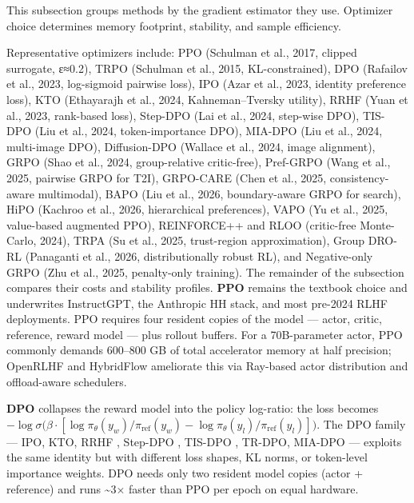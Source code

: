 \documentclass{article}
\begin{document}
This subsection groups methods by the gradient estimator they use. Optimizer choice determines memory footprint, stability, and sample efficiency.

Representative optimizers include: PPO (Schulman et al., 2017, clipped surrogate, ε≈0.2), TRPO (Schulman et al., 2015, KL-constrained), DPO (Rafailov et al., 2023, log-sigmoid pairwise loss), IPO (Azar et al., 2023, identity preference loss), KTO (Ethayarajh et al., 2024, Kahneman--Tversky utility), RRHF (Yuan et al., 2023, rank-based loss), Step-DPO (Lai et al., 2024, step-wise DPO), TIS-DPO (Liu et al., 2024, token-importance DPO), MIA-DPO (Liu et al., 2024, multi-image DPO), Diffusion-DPO (Wallace et al., 2024, image alignment), GRPO (Shao et al., 2024, group-relative critic-free), Pref-GRPO (Wang et al., 2025, pairwise GRPO for T2I), GRPO-CARE (Chen et al., 2025, consistency-aware multimodal), BAPO (Liu et al., 2026, boundary-aware GRPO for search), HiPO (Kachroo et al., 2026, hierarchical preferences), VAPO (Yu et al., 2025, value-based augmented PPO), REINFORCE++ and RLOO (critic-free Monte-Carlo, 2024), TRPA (Su et al., 2025, trust-region approximation), Group DRO-RL (Panaganti et al., 2026, distributionally robust RL), and Negative-only GRPO (Zhu et al., 2025, penalty-only training). The remainder of the subsection compares their costs and stability profiles. \textbf{PPO} \citep{schulman2017proximalpolicyopti} remains the textbook choice and underwrites InstructGPT, the Anthropic HH stack, and most pre-2024 RLHF deployments. PPO requires four resident copies of the model --- actor, critic, reference, reward model --- plus rollout buffers. For a 70B-parameter actor, PPO commonly demands 600--800 GB of total accelerator memory at half precision; OpenRLHF \citep{hu20252025} and HybridFlow \citep{sheng20242024} ameliorate this via Ray-based actor distribution and offload-aware schedulers.

\textbf{DPO} \citep{rafailov20232023} collapses the reward model into the policy log-ratio: the loss becomes \(-\log \sigma\bigl(\beta \cdot [\log \pi_\theta(y_w)/\pi_{\mathrm{ref}}(y_w) - \log \pi_\theta(y_l)/\pi_{\mathrm{ref}}(y_l)]\bigr)\). The DPO family --- IPO, KTO, RRHF \citep{yuan20232023}, Step-DPO \citep{lai20242024}, TIS-DPO \citep{liu20242024}, TR-DPO, MIA-DPO --- exploits the same identity but with different loss shapes, KL norms, or token-level importance weights. DPO needs only two resident model copies (actor + reference) and runs \textasciitilde3× faster than PPO per epoch on equal hardware.
\end{document}
